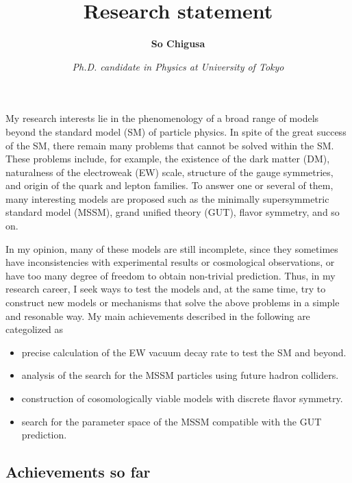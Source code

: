 \documentclass[12pt,notitlepage]{article}
\title{\vspace*{-3cm}Research statement}
\author{\textbf{So Chigusa}}
\date{\vspace*{-4mm}\textit{Ph.D. candidate in Physics at University of Tokyo}}
\begin{document}
\maketitle

My research interests lie in the phenomenology of a broad range of models beyond the standard model (SM) of particle physics.
In spite of the great success of the SM, there remain many problems that cannot be solved within the SM.
These problems include, for example, the existence of the dark matter (DM), naturalness of the electroweak (EW) scale, structure of the gauge symmetries, and origin of the quark and lepton families.
To answer one or several of them, many interesting models are proposed such as the minimally supersymmetric standard model (MSSM), grand unified theory (GUT), flavor symmetry, and so on.

In my opinion, many of these models are still incomplete, since they sometimes have inconsistencies with experimental results or cosmological observations, or have too many degree of freedom to obtain non-trivial prediction.
Thus, in my research career, I seek ways to test the models and, at the same time, try to construct new models or mechanisms that solve the above problems in a simple and resonable way.
My main achievements described in the following are categolized as
\vspace{-1.3mm}
\begin{itemize}
  \setlength{\parskip}{0mm}
  \setlength{\itemsep}{1mm}
  \item precise calculation of the EW vacuum decay rate to test the SM and beyond.
  \item analysis of the search for the MSSM particles using future hadron colliders.
  \item construction of cosomologically viable models with discrete flavor symmetry.
  \item search for the parameter space of the MSSM compatible with the GUT prediction.
\end{itemize}

\vspace*{-2mm}
\subsection*{Achievements so far}
\end{document}
